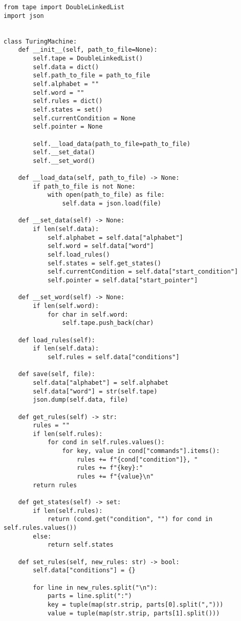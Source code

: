 \begin{lstlisting}
from tape import DoubleLinkedList
import json


class TuringMachine:
    def __init__(self, path_to_file=None):
        self.tape = DoubleLinkedList()
        self.data = dict()
        self.path_to_file = path_to_file
        self.alphabet = ""
        self.word = ""
        self.rules = dict()
        self.states = set()
        self.currentCondition = None
        self.pointer = None

        self.__load_data(path_to_file=path_to_file)
        self.__set_data()
        self.__set_word()

    def __load_data(self, path_to_file) -> None:
        if path_to_file is not None:
            with open(path_to_file) as file:
                self.data = json.load(file)

    def __set_data(self) -> None:
        if len(self.data):
            self.alphabet = self.data["alphabet"]
            self.word = self.data["word"]
            self.load_rules()
            self.states = self.get_states()
            self.currentCondition = self.data["start_condition"]
            self.pointer = self.data["start_pointer"]

    def __set_word(self) -> None:
        if len(self.word):
            for char in self.word:
                self.tape.push_back(char)

    def load_rules(self):
        if len(self.data):
            self.rules = self.data["conditions"]

    def save(self, file):
        self.data["alphabet"] = self.alphabet
        self.data["word"] = str(self.tape)
        json.dump(self.data, file)

    def get_rules(self) -> str:
        rules = ""
        if len(self.rules):
            for cond in self.rules.values():
                for key, value in cond["commands"].items():
                    rules += f"{cond["condition"]}, "
                    rules += f"{key}:"
                    rules += f"{value}\n"
        return rules

    def get_states(self) -> set:
        if len(self.rules):
            return (cond.get("condition", "") for cond in self.rules.values())
        else:
            return self.states

    def set_rules(self, new_rules: str) -> bool:
        self.data["conditions"] = {}

        for line in new_rules.split("\n"):
            parts = line.split(":")
            key = tuple(map(str.strip, parts[0].split(",")))
            value = tuple(map(str.strip, parts[1].split()))


\end{lstlisting}
